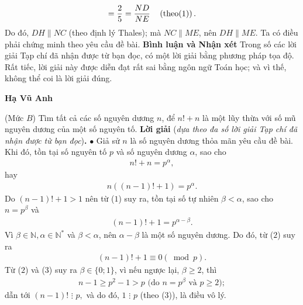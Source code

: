 \begin{multicols}{2}
\begin{align*}
			 = \frac{2}{5} = \frac{{ND}}{{NE}}\quad\left( {{\rm{theo}}(1)} \right).
	\end{align*}
	Do đó, $DH \parallel NC$ (theo định lý Thales); mà $NC \parallel ME$, nên $DH \parallel ME$.
	\vskip 0.05cm
	Ta có điều phải chứng minh theo yêu cầu đề bài. 
	\vskip 0.05cm
	\textbf{\color{thachthuctoanhoc}Bình luận và Nhận xét}
	\vskip 0.05cm
	Trong số các lời giải Tạp chí đã nhận được từ bạn đọc, có một lời giải bằng phương pháp tọa độ. Rất tiếc, lời giải này được diễn đạt rất sai bằng ngôn ngữ Toán học; và vì thế, không thể coi là lời giải đúng.
	\begin{flushright}
		\textbf{\color{thachthuctoanhoc}Hạ Vũ Anh}
	\end{flushright}
	{}
	(Mức $B$) Tìm tất cả các số nguyên dương $n$, để $n! + n$ là một lũy thừa với số mũ nguyên dương của một số nguyên tố.
	\vskip 0.05cm
	\textbf{\color{thachthuctoanhoc}Lời giải} (\textit{dựa theo đa số lời giải Tạp chí đã nhận được từ bạn đọc})\textbf{\color{thachthuctoanhoc}.}
	\vskip 0.05cm
	$\bullet$ Giả sử $n$ là số nguyên dương thỏa mãn yêu cầu đề bài.
	\vskip 0.05cm
	Khi đó, tồn tại số nguyên tố $p$ và số nguyên dương $\alpha$, sao cho
	\begin{align*}
		n! + n = {p^\alpha },
	\end{align*}
	hay  
	\begin{align*}
		n\left( {\left( {n - 1} \right)! + 1} \right) = {p^\alpha }. \tag{$1$}
	\end{align*}
	Do $\left( {n - 1} \right)! + 1 > 1$  nên từ ($1$) suy ra, tồn tại số tự nhiên $\beta < \alpha$, sao cho $n = p^{\beta}$  và
	\begin{align*}
		\left( {n - 1} \right)! + 1 = {p^{\alpha  - \beta }}. \tag{$2$}
	\end{align*}
	Vì  $\beta \in  \mathbb{N}, \alpha \in \mathbb{N^*}$   và $\beta < \alpha$, nên  $\alpha - \beta$ là một số nguyên dương. Do đó, từ ($2$) suy ra
	\begin{align*}
		\left( {n - 1} \right)! + 1 \equiv 0\left( {\bmod p} \right). \tag{$3$}
	\end{align*}
	Từ ($2$) và ($3$) suy ra $\beta \in \{0;1\}$, vì nếu ngược lại, $\beta \ge 2$,  thì
	\begin{align*}
		n - 1 \ge {p^2} - 1 > p \text{ (do $n = p^{\beta}$  và $p \ge 2$)};
	\end{align*}
	dẫn tới $\left( {n - 1} \right)! \,\,\vdots\,\, p,$  và do đó,  $1 \,\,\vdots\,\, p$ (theo ($3$)), là điều vô lý.
	\vskip 0.05cm

\end{multicols}
